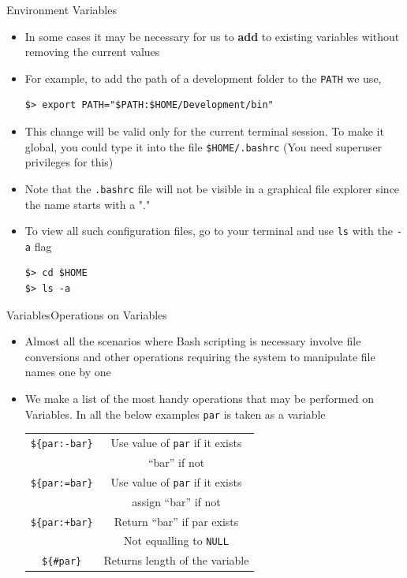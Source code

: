 \documentclass{beamer}
\begin{document}
\begin{frame}[fragile]{Environment Variables}
  \begin{itemize}
  \item In some cases it may be necessary for us to \textbf{add} to
    existing variables without removing the current values
  \item For example, to add the path of a development folder to the
    \verb|PATH| we use,
\begin{verbatim}
$> export PATH="$PATH:$HOME/Development/bin"
\end{verbatim}
  \item This change will be valid only for the current terminal
    session. To make it global, you could type it into the file
    \verb|$HOME/.bashrc| (You need superuser privileges for this)
  \item Note that the \verb|.bashrc| file will not be visible in a
    graphical file explorer since the name starts with a "."
  \item To view all such configuration files, go to your terminal and
    use \verb|ls| with the \verb|-a| flag
\begin{verbatim}
$> cd $HOME
$> ls -a
\end{verbatim}
  \end{itemize}
\end{frame}

\begin{frame}[fragile]{Variables}{Operations on Variables}
  \begin{itemize}
  \item Almost all the scenarios where Bash scripting is necessary
    involve file conversions and other operations requiring the
    system to manipulate file names one by one
  \item We make a list of the most handy operations that may be
    performed on Variables. In all the below examples \verb+par+ is
    taken as a variable\\
    \begin{center}
      \begin{tabular}{|c|c|}
        \hline
        \verb|${par:-bar}|&Use value of \verb+par+ if it exists\\
                          &``bar'' if not\\\hline
        \verb|${par:=bar}|&Use value of \verb+par+ if it exists\\
                          &assign ``bar'' if not\\\hline
        \verb|${par:+bar}|&Return ``bar'' if par exists\\
                          &Not equalling to \verb+NULL+\\\hline
        \verb|${#par}|&Returns length of the variable\\\hline 
      \end{tabular}
    \end{center}
  \end{itemize}
\end{frame}
\end{document}
